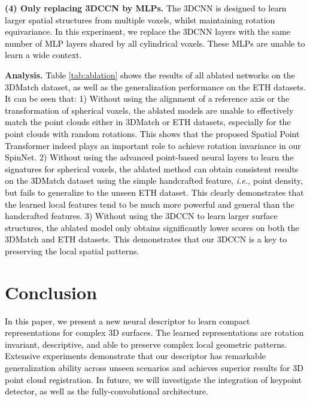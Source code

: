 \documentclass[final]{cvpr}
\newcommand{\qy}[1]{\textcolor{black}{#1}}
\newcommand{\bo}[1]{\textcolor{black}{#1}}
\newcommand{\unclear}[1]{\textcolor{black}{#1}}
\newcommand{\nickname}{SpinNet}
\begin{document}
\smallskip\noindent\textbf{(4) Only replacing 3DCCN by MLPs.} \qy{ The 3DCNN is designed to learn larger spatial structures from multiple voxels, whilst maintaining rotation equivariance. In this experiment, we replace the 3DCNN layers with the same number of MLP layers shared by all cylindrical voxels. These MLPs are unable to learn a wide context.
}


\textbf{Analysis.} \qy{Table \ref{tab:ablation} shows the results of all ablated networks on the 3DMatch dataset, as well as the generalization performance on the ETH datasets. It can be seen that: 1) Without using the alignment of a reference axis or the transformation of spherical voxels, the ablated models are unable to effectively match the point clouds either in 3DMatch or ETH datasets, especially for the point clouds with random rotations. This shows that the proposed Spatial Point Transformer indeed plays an important role to achieve rotation invariance in our \nickname{}.
2) Without using the advanced point-based neural layers to learn the signatures for spherical voxels, the ablated method can obtain consistent results on the 3DMatch dataset using the simple handcrafted feature, \textit{i.e.,} point density, but fails to generalize to the unseen ETH dataset. This clearly demonstrates that the learned local features tend to be much more powerful and general than the handcrafted features.
3) Without using the 3DCCN to learn larger surface structures, the ablated model only obtains significantly lower scores on both the 3DMatch and ETH datasets. This demonstrates that our 3DCCN is a key to preserving the local spatial patterns.
}
 
\section{Conclusion}
\bo{In this paper, we present a new neural descriptor to learn compact representations for complex 3D surfaces. The learned representations are rotation invariant, descriptive, and able to preserve complex local geometric patterns. Extensive experiments demonstrate that our descriptor has remarkable generalization ability across unseen scenarios and achieves superior results for 3D point cloud registration. \unclear{In future, we will investigate the integration  of keypoint detector, as well as the fully-convolutional architecture.
}
} 
 
\clearpage

{\small


}
\end{document}
